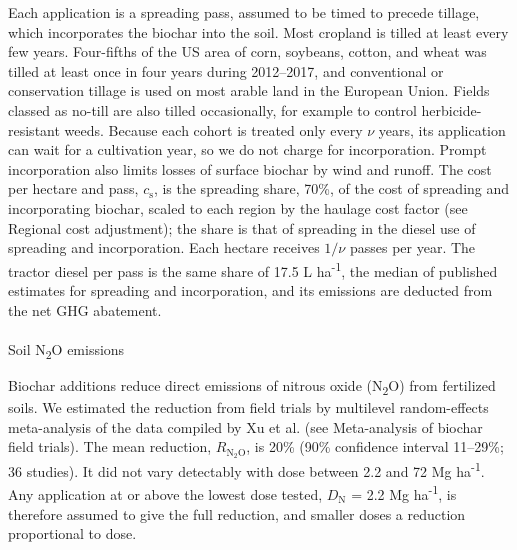 \documentclass[
  letterpaper,
  twoside,
  twocolumn,
  9pt]{article}
\makeatletter
\let\oldparagraph\paragraph
\renewcommand{\paragraph}{
    \@ifstar
      \xxxParagraphStar
      \xxxParagraphNoStar
  }
\newcommand{\xxxParagraphStar}[1]{\oldparagraph*{#1}\mbox{}}
\newcommand{\xxxParagraphNoStar}[1]{\oldparagraph{#1}\mbox{}}
\makeatother
\begin{document}
Each application is a spreading pass, assumed to be timed to precede
tillage, which incorporates the biochar into the soil. Most cropland is
tilled at least every few years. Four-fifths of the US area of corn,
soybeans, cotton, and wheat was tilled at least once in four years
during 2012--2017,\citep{claassen2018} and conventional or conservation
tillage is used on most arable land in the European
Union.\citep{eurostat2020tillage} Fields classed as no-till are also
tilled occasionally, for example to control herbicide-resistant
weeds.\citep{dang2018} Because each cohort is treated only every \(\nu\)
years, its application can wait for a cultivation year, so we do not
charge for incorporation. Prompt incorporation also limits losses of
surface biochar by wind and runoff.\citep{major2010} The cost per
hectare and pass, \(c_{\mathrm{s}}\), is the spreading share, 70\%, of
the cost of spreading and incorporating biochar,\citep{woolf2016optimal}
scaled to each region by the haulage cost factor (see Regional cost
adjustment); the share is that of spreading in the diesel use of
spreading and incorporation.\citep{leppakoski2021} Each hectare receives
\(1/\nu\) passes per year. The tractor diesel per pass is the same share
of 17.5 L ha\textsuperscript{-1}, the median of published estimates for
spreading and
incorporation,\citep{roberts2010, pujolpereira2016, leppakoski2021, cheng2025}
and its emissions are deducted from the net GHG abatement.

\paragraph{\texorpdfstring{Soil N\textsubscript{2}O
emissions}{Soil N2O emissions}}\label{soil-n2o-emissions}

Biochar additions reduce direct emissions of nitrous oxide
(N\textsubscript{2}O) from fertilized soils. We estimated the reduction
from field trials by multilevel random-effects meta-analysis of the data
compiled by Xu et al.\citep{xu2021} (see Meta-analysis of biochar field
trials). The mean reduction, \(R_{\mathrm{N_2O}}\), is 20\% (90\%
confidence interval 11--29\%; 36 studies). It did not vary detectably
with dose between 2.2 and 72 Mg ha\textsuperscript{-1}. Any application
at or above the lowest dose tested, \(D_{\mathrm{N}}\) = 2.2 Mg
ha\textsuperscript{-1}, is therefore assumed to give the full reduction,
and smaller doses a reduction proportional to dose.
\end{document}
